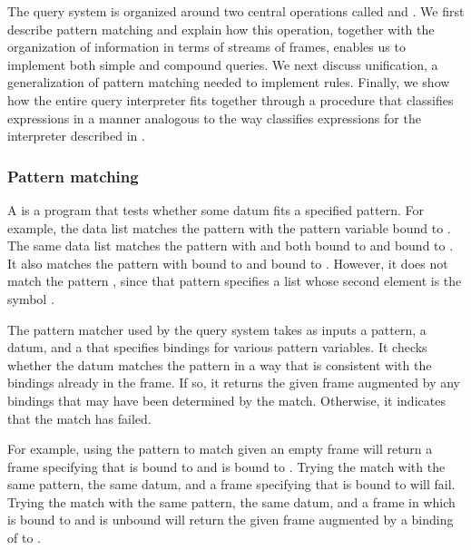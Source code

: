 The query system is organized around two central operations called  and .
We first describe pattern matching and explain how this operation, together with the organization of information in terms of streams of frames, enables us to implement both simple and compound queries.
We next discuss unification, a generalization of pattern matching needed to implement rules.
Finally, we show how the entire query interpreter fits together through a procedure that classifies expressions in a manner analogous to the way  classifies expressions for the interpreter described in .



\subsubsection*{Pattern matching}

A  is a program that tests whether some datum fits a specified pattern.
For example, the data list  matches the pattern  with the pattern variable  bound to .
The same data list matches the pattern  with  and  both bound to  and  bound to .
It also matches the pattern  with  bound to  and  bound to .
However, it does not match the pattern , since that pattern specifies a list whose second element is the symbol .

The pattern matcher used by the query system takes as inputs a pattern, a datum, and a  that specifies bindings for various pattern variables.
It checks whether the datum matches the pattern in a way that is consistent with the bindings already in the frame.
If so, it returns the given frame augmented by any bindings that may have been determined by the match.
Otherwise, it indicates that the match has failed.

For example, using the pattern  to match  given an empty frame will return a frame specifying that  is bound to  and  is bound to .
Trying the match with the same pattern, the same datum, and a frame specifying that  is bound to  will fail.
Trying the match with the same pattern, the same datum, and a frame in which  is bound to  and  is unbound will return the given frame augmented by a binding of  to .

